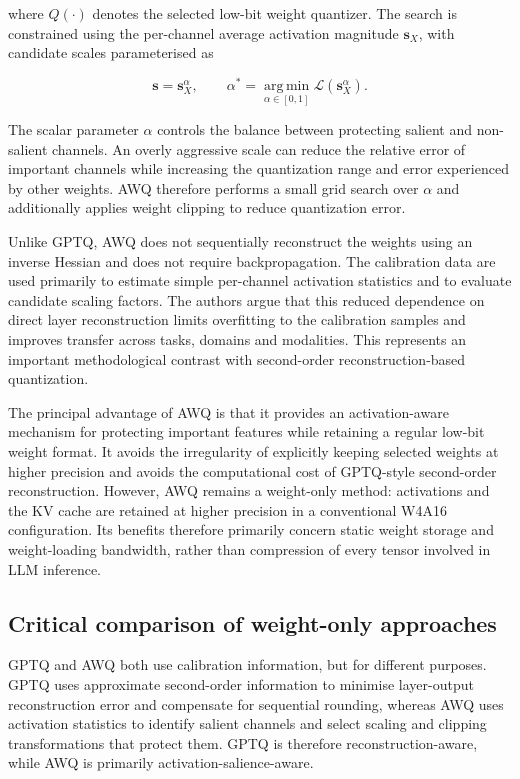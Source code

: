 where \(Q(\cdot)\) denotes the selected low-bit weight quantizer. The
search is constrained using the per-channel average activation
magnitude \(\mathbf{s}_{X}\), with candidate scales parameterised as

\begin{equation}
\mathbf{s}
=
\mathbf{s}_{X}^{\alpha},
\qquad
\alpha^{*}
=
\underset{\alpha\in[0,1]}{\operatorname{arg\,min}}
\mathcal{L}\left(\mathbf{s}_{X}^{\alpha}\right).
\label{eq:awq-scale-search}
\end{equation}

The scalar parameter \(\alpha\) controls the balance between protecting
salient and non-salient channels. An overly aggressive scale can reduce
the relative error of important channels while increasing the
quantization range and error experienced by other weights. AWQ
therefore performs a small grid search over \(\alpha\) and additionally
applies weight clipping to reduce quantization error.

Unlike GPTQ, AWQ does not sequentially reconstruct the weights using an
inverse Hessian and does not require backpropagation. The calibration
data are used primarily to estimate simple per-channel activation
statistics and to evaluate candidate scaling factors. The authors argue
that this reduced dependence on direct layer reconstruction limits
overfitting to the calibration samples and improves transfer across
tasks, domains and modalities. This represents an
important methodological contrast with second-order
reconstruction-based quantization.

The principal advantage of AWQ is that it provides an activation-aware
mechanism for protecting important features while retaining a regular
low-bit weight format. It avoids the irregularity of explicitly keeping
selected weights at higher precision and avoids the computational cost
of GPTQ-style second-order reconstruction. However, AWQ remains a
weight-only method: activations and the KV cache are retained at higher
precision in a conventional W4A16 configuration. Its benefits therefore
primarily concern static weight storage and weight-loading bandwidth,
rather than compression of every tensor involved in LLM inference.

\subsection{Critical comparison of weight-only approaches}

GPTQ and AWQ both use calibration information, but for different
purposes. GPTQ uses approximate second-order information to minimise
layer-output reconstruction error and compensate for sequential
rounding, whereas AWQ uses activation statistics to identify salient
channels and select scaling and clipping transformations that protect
them. GPTQ is therefore reconstruction-aware, while AWQ is primarily
activation-salience-aware.


